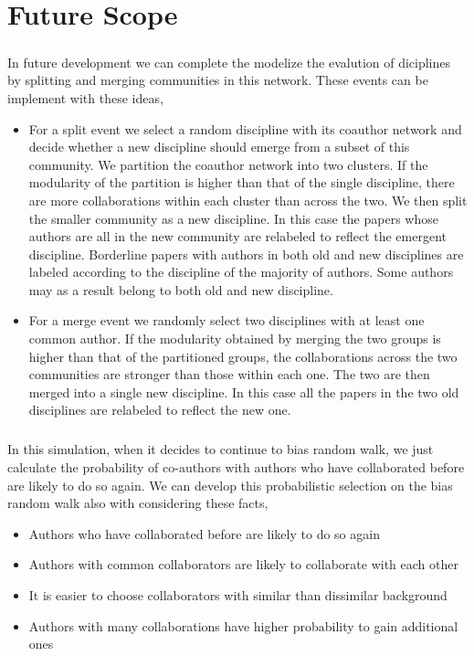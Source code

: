 \chapter{Future Scope}
\paragraph{}
In future development we can complete the modelize the evalution of diciplines by splitting and merging communities in this network.
These events can be implement with these ideas,
\begin{itemize}
 \item For a split event we select a random discipline with its coauthor network and decide whether a new discipline should emerge from a subset of this community.
We partition the coauthor network into two clusters.
If the modularity of the partition is higher than that of the single discipline, there are more collaborations within each cluster than across the two.
We then split the smaller community as a new discipline.
In this case the papers whose authors are all in the new community are relabeled to reﬂect the emergent discipline.
Borderline papers with authors in both old and new disciplines are labeled according to the discipline of the majority of authors.
Some authors may as a result belong to both old and new discipline.
 \item For a merge event we randomly select two disciplines with at least one common author.
If the modularity obtained by merging the two groups is higher than that of the partitioned groups, the collaborations across the two communities are stronger than those within each one. The two are then merged into a single new discipline.
In this case all the papers in the two old disciplines are relabeled to reﬂect the new one.
\end{itemize}
\paragraph{}
In this simulation, when it decides to continue to bias random walk, we just calculate the probability of co-authors with authors who have collaborated before are likely to do so again.
We can develop this probabilistic selection on the bias random walk also with considering these facts,
\begin{itemize}
 \item Authors who have collaborated before are likely to do so again
 \item Authors with common collaborators are likely to collaborate with each other
 \item It is easier to choose collaborators with similar than dissimilar background
 \item Authors with many collaborations have higher probability to gain additional ones
\end{itemize}